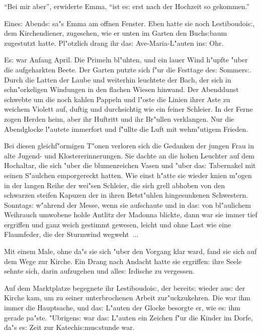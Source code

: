 \documentclass[oneside,12pt]{book}
\newcommand{\s}{s:}%
\begin{document}
"`Bei mir aber"', erwiderte Emma, "`ist e{\s} erst nach der
Hochzeit so gekommen."'


\newpage\begin{center}
{\large \so{Se{ch}{st}e{\s} Kapitel}}\bigskip\bigskip
\end{center}

Eine{\s} Abend{\s} sa"s Emma am offnen Fenster. Eben hatte sie
noch Lestiboudoi{\s}, dem Kirchendiener, zugesehen, wie er unten
im Garten den Buch{\s}baum zugestutzt hatte. Pl"otzlich drang ihr
da{\s} Ave-Maria-L"auten in{\s} Ohr.

E{\s} war Anfang April. Die Primeln bl"uhten, und ein lauer Wind
h"upfte "uber die aufgeharkten Beete. Der Garten putzte sich f"ur
die Festtage de{\s} Sommer{\s}. Durch die Latten der Laube und
weiterhin leuchtete der Bach, der sich in schn"orkeligen Windungen
in den flachen Wiesen hinwand. Der Abenddunst schwebte um die noch
kahlen Pappeln und l"oste die Linien ihrer Aste zu weichem Violett
auf, duftig und durchsichtig wie ein feiner Schleier. In der Ferne
zogen Herden heim, aber ihr Huftritt und ihr Br"ullen verklangen.
Nur die Abendglocke l"autete immerfort und f"ullte die Luft mit
wehm"utigem Frieden.

Bei diesen gleichf"ormigen T"onen verloren sich die Gedanken der
jungen Frau in alte Jugend- und Klostererinnerungen. Sie dachte an
die hohen Leuchter auf dem Hochaltar, die sich "uber die
blumenreichen Vasen und "uber da{\s} Tabernakel mit seinen
S"aulchen emporgereckt hatten. Wie einst h"atte sie wieder knien
m"ogen in der langen Reihe der wei"sen Schleier, die sich grell
abhoben von den schwarzen steifen Kapuzen der in ihren Betst"uhlen
hingesunkenen Schwestern. Sonntag{\s} w"ahrend der Messe, wenn sie
aufschaute und in da{\s} von bl"aulichem Weihrauch umwobene holde
Antlitz der Madonna blickte, dann war sie immer tief ergriffen und
ganz weich gestimmt gewesen, leicht und ohne Last wie eine
Flaumfeder, die der Sturmwind wegweht~...

Mit einem Male, ohne da"s sie sich "uber den Vorgang klar ward,
fand sie sich auf dem Wege zur Kirche. Ein Drang nach Andacht
hatte sie ergriffen: ihre Seele sehnte sich, darin aufzugehen und
alle{\s} Irdische zu vergessen.

Auf dem Marktplatze begegnete ihr Lestiboudoi{\s}, der bereit{\s}
wieder au{\s} der Kirche kam, um zu seiner unterbrochenen Arbeit
zur"uckzukehren. Die war ihm immer die Hauptsache, und da{\s}
L"auten der Glocke besorgte er, wie e{\s} ihm gerade pa"ste.
"Ubrigen{\s} war da{\s} L"auten ein Zeichen f"ur die Kinder im
Dorfe, da"s e{\s} Zeit zur Katechi{\s}mu{\s}stunde war.
\end{document}
